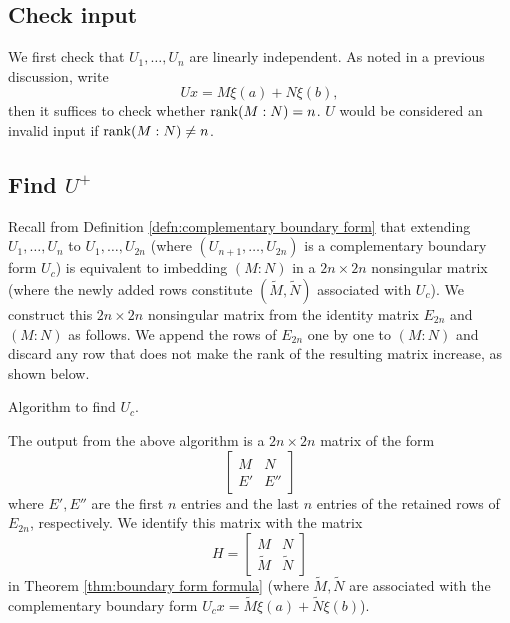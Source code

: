 \documentclass[11pt, oneside, a4paper]{article}
\begin{document}
\subsection{Check input}
We first check that $U_1,\ldots, U_n$ are linearly independent. As noted in a previous discussion, write
\[Ux = M\xi(a) + N\xi(b),\]
then it suffices to check whether $\operatorname{rank}(M:N)=n$. $U$ would be considered an invalid input if $\operatorname{rank}(M:N)\neq n$.

\subsection{Find $U^+$}
Recall from Definition \ref{defn:complementary boundary form} that extending $U_1,\ldots,U_n$ to $U_1,\ldots,U_{2n}$ (where $(U_{n+1},\ldots, U_{2n})$ is a complementary boundary form $U_c$) is equivalent to imbedding $(M:N)$ in a $2n\times 2n$ nonsingular matrix (where the newly added rows constitute $(\tilde{M}, \tilde{N})$ associated with $U_c$). We construct this $2n\times 2n$ nonsingular matrix from the identity matrix $E_{2n}$ and $(M:N)$ as follows. We append the rows of $E_{2n}$ one by one to $(M:N)$ and discard any row that does not make the rank of the resulting matrix increase, as shown below.

\begin{algorithm}[H]
    \caption{Algorithm to find $U_c$.}\label{algo:Find $U_c$.}
\end{algorithm}

The output from the above algorithm is a $2n\times 2n$ matrix of the form
\[\begin{bmatrix}M & N\\ E' & E''\end{bmatrix}\]
where $E', E''$ are the first $n$ entries and the last $n$ entries of the retained rows of $E_{2n}$, respectively. We identify this matrix with the matrix
\[H = \begin{bmatrix}M&N\\ \tilde{M} & \tilde{N}\end{bmatrix}\]
in Theorem \ref{thm:boundary form formula} (where $\tilde{M}, \tilde{N}$ are associated with the complementary boundary form $U_c x = \tilde{M}\xi(a) + \tilde{N}\xi(b)$).
\end{document}
